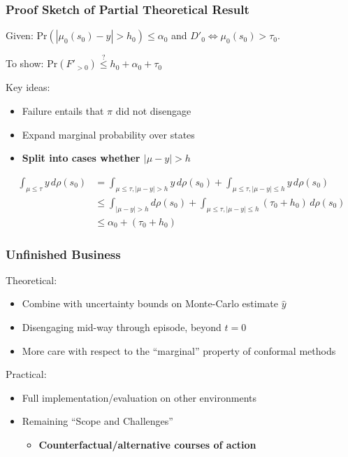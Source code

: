 \documentclass[handout]{beamer}
\begin{document}
\begin{frame}
    \frametitle{Proof Sketch of Partial Theoretical Result}

    Given: $\text{Pr}(|\mu_0(s_0) - y| > h_0) \leq \alpha_0$ and $D'_0 \Leftrightarrow \mu_0(s_0) > \tau_0$.

    To show: $\text{Pr}(F'_{>0}) \overset{?}{\leq} h_0 + \alpha_0 + \tau_0$

    \vspace{.5em}

    Key ideas:
    \begin{itemize}
    \item Failure entails that $\pi$ did not disengage
    \item Expand marginal probability over states
    \item \textbf{Split into cases whether $|\mu - y|>h$}
    \end{itemize}

    \begin{align*}
    \int_{\mu \leq \tau}y\, d\rho(s_0)
        &= \int_{\mu \leq \tau, |\mu-y|>h} y\, d\rho(s_0) + \int_{\mu \leq \tau, |\mu-y|\leq h} y\, d\rho(s_0) \\
        &\leq \int_{|\mu-y|>h}d\rho(s_0) + \int_{\mu \leq \tau, |\mu-y|\leq h} (\tau_0+h_0)\, d\rho(s_0) \\
        &\leq \alpha_0 + (\tau_0+h_0)
    \end{align*}

\end{frame}

\begin{frame}
    \frametitle{Unfinished Business}

    Theoretical:
    \begin{itemize}
    \item Combine with uncertainty bounds on Monte-Carlo estimate $\hat{y}$
    \item Disengaging mid-way through episode, beyond $t=0$
    \item More care with respect to the ``marginal'' property of conformal methods
    \end{itemize}

    Practical:
    \begin{itemize}
    \item Full implementation/evaluation on other environments
    \item Remaining ``Scope and Challenges''
        \begin{itemize}
        \item \textbf{Counterfactual/alternative courses of action}
        \end{itemize}
    \end{itemize}

\end{frame}
\end{document}
